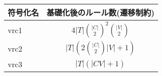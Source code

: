 \begingroup
\renewcommand{\arraystretch}{1.5}
\begin{tabular}{l|c}\hline
  符号化名 & 基礎化後のルール数(遷移制約) \\ \hline
  vrc1 & $4|T|{|C|\choose 2}^{2}{|V|\choose 2}$ \\ \hline
  vrc2 & $|T|\left(2{|C|\choose 2}|V| + 1\right)$ \\ \hline
  vrc3 & $|T|(|CV| + 1)$ \\ \hline
\end{tabular}
\endgroup